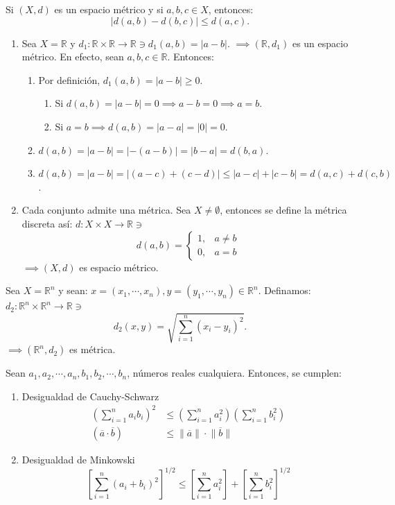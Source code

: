 \begin{prop}
	Si $(X,d)$ es un espacio métrico y si $a,b,c\in X$, entonces: 
	$$|d(a,b)-d(b,c)|\leq d(a,c).$$
\end{prop}

\begin{ejemplo}
	\begin{enumerate}
		\item Sea $X=\mathbb{R}$ y $d_1:\mathbb{R}\times \mathbb{R}\to \mathbb{R}\ni d_1(a,b)=|a-b|$. $\implies (\mathbb{R},d_1)$ es un espacio métrico. En efecto, sean $a,b,c\in \mathbb{R}$. Entonces: 
		\begin{enumerate}
			\item Por definición, $d_1(a,b)=|a-b|\geq 0$. 
			\begin{enumerate}
				\item Si $d(a,b)= |a-b|=0\implies a-b=0\implies a=b$. 
				\item Si $a=b\implies d(a,b)=|a-a|=|0|=0$.
			\end{enumerate}
			\item $d(a,b)=|a-b|=|-(a-b)|=|b-a|=d(b,a)$.
			\item $d(a,b)=|a-b|=|(a-c)+(c-d)|\leq |a-c|+|c-b|=d(a,c)+d(c,b)$.
		\end{enumerate}
	\item Cada conjunto admite una métrica. Sea $X\neq \emptyset$, entonces se define la métrica discreta así: $d:X\times X\to \mathbb{R}\ni$ 
	$$d(a,b)=\begin{cases}1, & a\neq b\\ 0, & a=b\end{cases}$$
	$\implies (X,d)$ es espacio métrico.  
	\end{enumerate}
\end{ejemplo}

\begin{ejemplo}
	Sea $X=\mathbb{R}^n$ y sean: 
	$x=(x_1,\cdots, x_n), y=(y_1,\cdots, y_n)\in \mathbb{R}^n$. Definamos: $d_2:\mathbb{R}^n\times \mathbb{R}^n\to \mathbb{R}\ni$ 
$$d_2(x,y)=\sqrt{\sum_{i=1}^{n}\left(x_i-y_i\right)^2}.$$
$\implies (\mathbb{R}^n, d_2)$ es métrica. 
\end{ejemplo}

\begin{lema}
	Sean $a_1,a_2,\cdots, a_n, b_1,b_2, \cdots, b_n$, números reales cualquiera. Entonces, se cumplen: 
	\begin{enumerate}
		\item Desigualdad de Cauchy-Schwarz
		\begin{align*}
			\left(\sum_{i=1}^{n}a_ib_i\right)^2&\leq \left(\sum_{i=1}^{n}a_i^2\right)\left(\sum_{i=1}^{n}b_i^2\right)\\
			(\overline{a}\cdot \overline{b})&\leq \lVert \overline{a} \rVert\cdot \lVert \overline{b} \rVert
		\end{align*}
	\item Desigualdad de Minkowski 
	$$\left[\sum_{i=1}^n (a_i+b_i)^2\right]^{1/2}\leq \left[\sum_{i=1}^{n}a_i^2\right]+\left[\sum_{i=1}^n b_i^2\right]^{1/2}$$
	\end{enumerate}
\end{lema}

